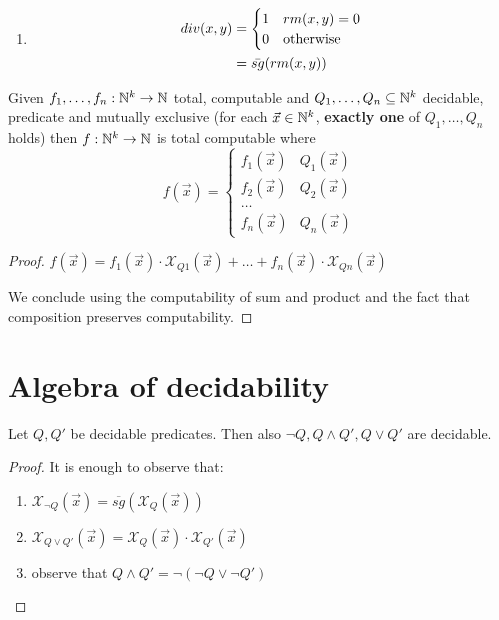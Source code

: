 \begin{observation}
\begin{enumerate}
\item \begin{align*}
div(x,y) &= \begin{cases}
    1 & rm(x,y) = 0                                   \\
    0 & $otherwise$
  \end{cases}\\
  &= \bar{sg}(rm(x,y))
\end{align*}
\end{enumerate}
\end{observation}

\begin{corollary}
  Given $f_1,\dots,f_n: \mathbb{N}^k \rightarrow \mathbb{N}$ total, computable and
  $Q_1,\dots,Q_n \subseteq \mathbb{N}^k$ decidable, predicate and mutually
  exclusive (for each $\vec{x} \in \mathbb{N}^k$, \textbf{exactly one} of
  $Q_1,\dots,Q_n$ holds) then $ f:\mathbb{N}^k \rightarrow \mathbb{N} $ is total
  computable where
  \begin{equation*}
    f(\vec{x}) = \begin{cases}
      f_1(\vec{x}) & Q_1(\vec{x}) \\
      f_2(\vec{x}) & Q_2(\vec{x}) \\
      \dots        &              \\
      f_n(\vec{x}) & Q_n(\vec{x})
    \end{cases}
  \end{equation*}
\end{corollary}

\begin{proof}
$f(\vec{x}) = f_1(\vec{x}) \cdot \mathcal{X}_{Q1}(\vec{x}) + \dots + f_n(\vec{x}) \cdot \mathcal{X}_{Qn}(\vec{x})$

We conclude using the computability of sum and product and the fact that composition preserves computability.
\end{proof}

\section{Algebra of decidability}

\begin{lemma}
  Let $Q, Q'$ be  decidable predicates.  Then also $\neg Q, Q \wedge Q', Q \vee Q'$ are decidable.
\end{lemma}

\begin{proof}
It is enough to observe that:
\begin{enumerate}
\item $\mathcal{X}_{\lnot Q}(\vec{x}) =  \overline{sg}(\mathcal{X}_Q(\vec{x}))$
\item $\mathcal{X}_{Q \vee Q'}(\vec{x}) = \mathcal{X}_{Q}(\vec{x}) \cdot \mathcal{X}_{Q'}(\vec{x})$
\item observe that $Q \wedge Q' = \lnot (\lnot Q \vee \lnot Q')$
\end{enumerate}
\end{proof}


